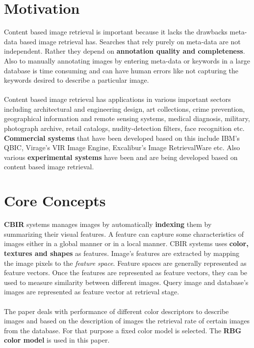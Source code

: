 \documentclass[pstricks,10pt,notitlepage]{report}
\begin{document}
\section{Motivation}
Content based image retrieval is important because it lacks the drawbacks meta-data based image retrieval has. Searches that rely purely on meta-data are not independent. Rather they depend on \textbf{annotation quality and completeness}. Also to manually annotating images by entering meta-data  or keywords in a large database is time consuming and can have human errors like not capturing the keywords desired to describe a particular image.\\
\\
Content based image retrieval has applications in various important sectors including architectural and engineering design, art collections, crime prevention, geographical information and remote sensing systems, medical diagnosis, military, photograph archive, retail catalogs, nudity-detection filters, face recognition etc. \textbf{Commercial systems} that have been developed based on this include IBM’s QBIC, Virage’s VIR Image Engine, Excalibur’s Image RetrievalWare etc. Also various \textbf{experimental systems} have been and are being developed based on content based image retrieval.

\section{Core Concepts}
\textbf{CBIR} systems manages images by automatically \textbf{indexing} them by summ{}arizing their visual features\cite{n1,n2,n3,n4,n5,n6,n7,n8,n9}. A feature can capture some characteristics of images either in a global manner or in a local manner\cite{n5}. CBIR systems uses \textbf{color, textures and shapes} as features. Image’s features are extracted by mapping the image pixels to the \textit{feature space}. Feature spaces are generally represented as feature vectors. Once the features are represented as feature vectors, they can be used to measure similarity between different images. Query image and database's images are represented as feature vector at retrieval stage.\cite{n8}\\
\\
The paper deals with performance of different color descriptors to describe images and based on the description of images the retrieval rate of certain images from the database. For that purpose a fixed color model is selected. The \textbf{RBG color model} is used in this paper. 
\end{document}
